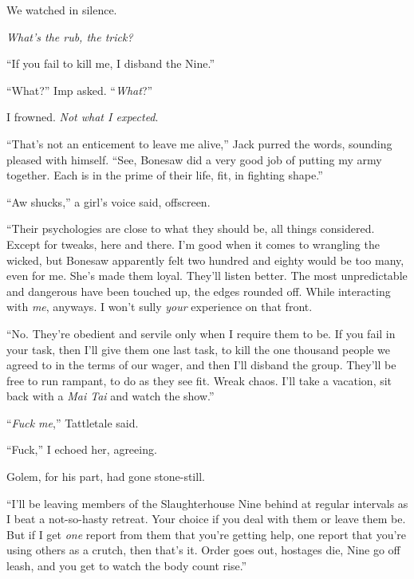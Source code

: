 We watched in silence.



\emph{What's the rub, the trick? }



``If you fail to kill me, I disband the Nine.''



``What?'' Imp asked.  ``\emph{What}?''



I frowned.  \emph{Not what I expected}.



``That's not an enticement to leave me alive,'' Jack purred the words, sounding pleased with himself.  ``See, Bonesaw did a very good job of putting my army together.  Each is in the prime of their life, fit, in fighting shape.''



``Aw shucks,'' a girl's voice said, offscreen.



``Their psychologies are close to what they should be, all things considered.  Except for tweaks, here and there.  I'm good when it comes to wrangling the wicked, but Bonesaw apparently felt two hundred and eighty would be too many, even for me.  She's made them loyal.  They'll listen better.  The most unpredictable and dangerous have been touched up, the edges rounded off.  While interacting with \emph{me}, anyways.  I won't sully \emph{your} experience on that front.



``No.  They're obedient and servile only when I require them to be.  If you fail in your task, then I'll give them one last task, to kill the one thousand people we agreed to in the terms of our wager, and then I'll disband the group.  They'll be free to run rampant, to do as they see fit.  Wreak chaos.  I'll take a vacation, sit back with a \emph{Mai Tai} and watch the show.''



``\emph{Fuck me},'' Tattletale said.



``Fuck,'' I echoed her, agreeing.



Golem, for his part, had gone stone-still.



``I'll be leaving members of the Slaughterhouse Nine behind at regular intervals as I beat a not-so-hasty retreat.  Your choice if you deal with them or leave them be.  But if I get \emph{one} report from them that you're getting help, one report that you're using others as a crutch, then that's it.  Order goes out, hostages die, Nine go off leash, and you get to watch the body count rise.''



